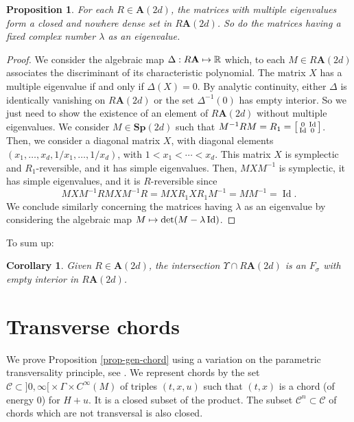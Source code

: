 \documentclass[10pt]{amsart}
\newcommand\mto{\mathchoice{\longmapsto}{\mapsto}{\mapsto}{\mapsto}}
\newenvironment{smallbmatrix}{\big[\begin{smallmatrix}}{\end{smallmatrix}\big]}
\DeclareMathOperator{\Id}{Id}
\newcommand{\Rm}{\mathbb{R}}
\newcommand{\mC}{\ensuremath{\mathcal{C}}}
\newcommand{\Sp}{\mathbf{Sp}}
\newcommand{\A}{\mathbf{A}}
\theoremstyle{plain}
\newtheorem{cor}[lem]{Corollary}
\newtheorem{prop}[lem]{Proposition}
\theoremstyle{definition}
\begin{document}
\begin{prop}\label{prop-gen}
For each $R\in \A(2d)$, the matrices with multiple eigenvalues form a closed and nowhere dense set in $R\A(2d)$. So do the matrices having a fixed complex number $\lambda$ as an eigenvalue.
\end{prop}

\begin{proof}
We consider the algebraic map $\Delta: R\A\mto \Rm$ which, to each $M\in R\A(2d)$ associates the discriminant of its characteristic polynomial. The matrix $X$ has a multiple eigenvalue if and only if $\Delta(X)=0$.
By analytic continuity, either $\Delta$ is identically vanishing on $R\A(2d)$ or the set $\Delta^{-1}(0)$ has empty interior.
So we just need to show the existence of an element of $R\A(2d)$ without multiple eigenvalues.
We consider $M\in \Sp(2d)$ such that
$M^{-1}RM=R_1=
\begin{smallbmatrix} 0&\Id\\\Id&0\end{smallbmatrix}
$.
Then, we consider a diagonal matrix $X$, with diagonal elements $(x_1, \ldots, x_d, 1/x_1, \ldots, 1/x_d)$,
with $1<x_1< \cdots <x_d$. This matrix $X$ is symplectic and $R_1$-reversible, and it has simple eigenvalues.
Then, $MXM^{-1}$ is symplectic, it has simple eigenvalues, and it is $R$-reversible since
\[
MXM^{-1}RMXM^{-1}R=MXR_1XR_1M^{-1}=MM^{-1}=\Id.
\]
We conclude similarly concerning the matrices having $\lambda$ as an eigenvalue by considering the algebraic map $M\mto \det (M-\lambda \Id)$.
\end{proof}

To sum up:

\begin{cor} \label{cor-RA}
Given $R\in \A(2d)$, the intersection $\Upsilon\cap R\A(2d)$ is an $F_{\sigma}$ with empty interior in $R\A(2d)$.
\end{cor}

\section{Transverse chords}\label{sec-tc}
We prove Proposition \ref{prop-gen-chord} using a variation on the parametric transversality principle, see \cite{A63}.
We represent chords by the set $\mC\subset ]0,\infty[{}\times \Gamma\times C^{\infty}(M)$ of triples $(t,x,u)$
such that $(t,x)$ is a chord (of energy $0$) for $H+u$. It is a closed subset of the product. The subset $\mC^n\subset\mC$ of chords which are not transversal is also closed.
\end{document}
